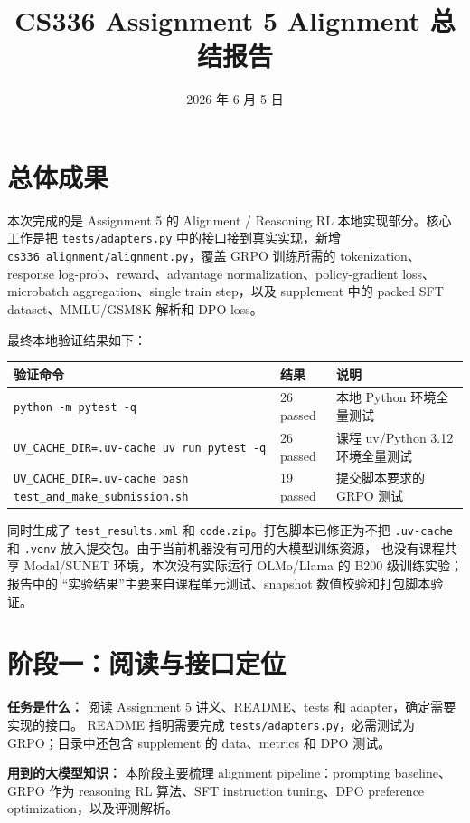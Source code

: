 \documentclass[UTF8]{ctexart}
\title{CS336 Assignment 5 Alignment 总结报告}
\author{}
\date{2026 年 6 月 5 日}
\begin{document}
\maketitle

\section{总体成果}

本次完成的是 Assignment 5 的 Alignment / Reasoning RL 本地实现部分。核心工作是把
\texttt{tests/adapters.py} 中的接口接到真实实现，新增
\texttt{cs336\_alignment/alignment.py}，覆盖 GRPO 训练所需的 tokenization、response
log-prob、reward、advantage normalization、policy-gradient loss、microbatch
aggregation、single train step，以及 supplement 中的 packed SFT dataset、MMLU/GSM8K
解析和 DPO loss。

最终本地验证结果如下：

\begin{center}
\begin{tabular}{lll}
\toprule
验证命令 & 结果 & 说明 \\
\midrule
\texttt{python -m pytest -q} & 26 passed & 本地 Python 环境全量测试 \\
\texttt{UV\_CACHE\_DIR=.uv-cache uv run pytest -q} & 26 passed & 课程 uv/Python 3.12 环境全量测试 \\
\texttt{UV\_CACHE\_DIR=.uv-cache bash test\_and\_make\_submission.sh} & 19 passed & 提交脚本要求的 GRPO 测试 \\
\bottomrule
\end{tabular}
\end{center}

同时生成了 \texttt{test\_results.xml} 和 \texttt{code.zip}。打包脚本已修正为不把
\texttt{.uv-cache} 和 \texttt{.venv} 放入提交包。由于当前机器没有可用的大模型训练资源，
也没有课程共享 Modal/SUNET 环境，本次没有实际运行 OLMo/Llama 的 B200 级训练实验；报告中的
``实验结果''主要来自课程单元测试、snapshot 数值校验和打包脚本验证。

\section{阶段一：阅读与接口定位}

\textbf{任务是什么：} 阅读 Assignment 5 讲义、README、tests 和 adapter，确定需要实现的接口。
README 指明需要完成 \texttt{tests/adapters.py}，必需测试为 GRPO；目录中还包含 supplement
的 data、metrics 和 DPO 测试。

\textbf{用到的大模型知识：} 本阶段主要梳理 alignment pipeline：prompting baseline、GRPO
作为 reasoning RL 算法、SFT instruction tuning、DPO preference optimization，以及评测解析。
\end{document}
